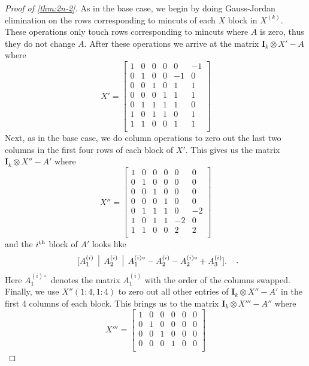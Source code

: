 \documentclass[10pt,a4paper]{article}
\newcommand{\Id}{\mathbf{I}}
\newcommand{\ith}{i^{\scriptsize \mbox{{\rm th}}}}
\newcommand{\1}{\mathbf{1}}
\theoremstyle{definition}
\begin{document}
\begin{proof}[Proof of \cref{thm:2n-2}]
As in the base case, we begin by doing Gauss-Jordan elimination on the rows corresponding to mincuts of each $X$ block in $X^{(k)}$.  These operations
only touch rows corresponding to mincuts where $A$ is zero, thus they do not change $A$.  After these operations we arrive at the matrix $\Id_k \otimes X' - A$
where
\[
X' =
\begin{bmatrix}
1 &  0 &  0 &  0 &  0 & -1 \\
0 &  1 &  0 &  0 & -1 &  0 \\
0 &  0 &  1 &  0 &  1 &  1 \\
0 &  0 &  0 &  1 &  1 &  1 \\
0 &  1 &  1 &  1 &  1 &  0 \\
1 &  0 &  1 &  1 &  0 &  1 \\
1 &  1 &  0 &  0 &  1 &  1 \\
\end{bmatrix}
\]
Next, as in the base case, we do column operations to zero out the last two columns in the first four rows of each block of $X'$.  This
gives us the matrix $\Id_k \otimes X'' - A'$ where
\[
X'' =
\begin{bmatrix}
1 &  0 &  0 &  0 &  0 & 0 \\
0 &  1 &  0 &  0 & 0 &  0 \\
0 &  0 &  1 &  0 &  0 &  0 \\
0 &  0 &  0 &  1 &  0 &  0 \\
0 &  1 &  1 &  1 &  0 &  -2 \\
1 &  0 &  1 &  1 &  -2 &  0 \\
1 &  1 &  0 &  0 &  2 &  2 \\
\end{bmatrix}
\]
and the $\ith$ block of $A'$ looks like
\[
\begin{tabular}{c|c|c}
$[A_1^{(i)}$ & $A_2^{(i)}$ & $A_1^{(i)\circ} -A_2^{(i)} - A_2^{(i)\circ} + A_3^{(i)}] .$
\end{tabular}
\enspace.
\]
Here $A_1^{(i)\circ}$ denotes the matrix $A_1^{(i)}$ with the order of the columns swapped.
Finally, we use $X''(1:4,1:4)$ to zero out all other entries of $\Id_k \otimes X'' - A'$ in the first 4 columns of each block.
This brings us to the matrix $\Id_k \otimes X''' - A''$ where
\[
X''' =
\begin{bmatrix}
1 &  0 &  0 &  0 &  0 & 0 \\
0 &  1 &  0 &  0 & 0 &  0 \\
0 &  0 &  1 &  0 &  0 &  0 \\
0 &  0 &  0 &  1 &  0 &  0 \\

\end{bmatrix}\]
\end{proof}
\end{document}
